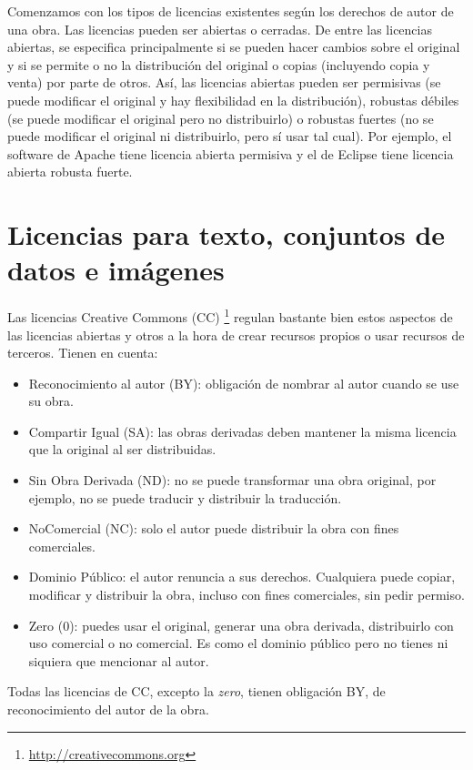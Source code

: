 Comenzamos con los tipos de licencias existentes según los derechos de autor de una obra. Las licencias pueden ser abiertas o cerradas. De entre las licencias abiertas, se especifica principalmente si se pueden hacer cambios sobre el original y si se permite o no la distribución del original o copias (incluyendo copia y venta) por parte de otros. Así, las licencias abiertas pueden ser permisivas (se puede modificar el original y hay flexibilidad en la distribución), robustas débiles (se puede modificar el original pero no distribuirlo) o robustas fuertes (no se puede modificar el original ni distribuirlo, pero sí usar tal cual). Por ejemplo, el software de Apache tiene licencia abierta permisiva y el de Eclipse tiene licencia abierta robusta fuerte.

\section{Licencias para texto, conjuntos de datos e imágenes}

Las licencias Creative Commons (CC) \footnote{\url{http://creativecommons.org}} regulan bastante bien estos aspectos de las licencias abiertas y otros a la hora de crear recursos propios o usar recursos de terceros. Tienen en cuenta:
\begin{itemize}
    \item Reconocimiento al autor (BY): obligación de nombrar al autor cuando se use su obra.
    \item Compartir Igual (SA): las obras derivadas deben mantener la misma licencia que la original al ser distribuidas.
    \item Sin Obra Derivada (ND): no se puede transformar una obra original, por ejemplo, no se puede traducir y distribuir la traducción.
    \item NoComercial (NC): solo el autor puede distribuir la obra con fines comerciales.
    \item Dominio Público: el autor renuncia a sus derechos. Cualquiera puede copiar, modificar y distribuir la obra, incluso con fines comerciales, sin pedir permiso.
    \item Zero (0): puedes usar el original, generar una obra derivada, distribuirlo con uso comercial o no comercial. Es como el dominio público pero no tienes ni siquiera que mencionar al autor.
\end{itemize}

Todas las licencias de CC, excepto la \textit{zero}, tienen obligación BY, de reconocimiento del autor de la obra.

